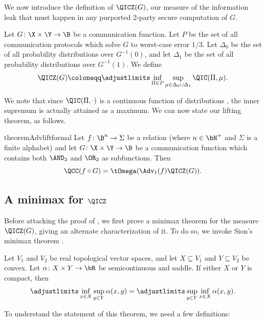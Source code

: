 We now introduce the definition of $\QICZ(G)$,
our measure of the information leak that must
happen in any purported 2-party secure computation of $G$.

\begin{definition}
Let $G\colon\X\times\Y\to\B$ be a communication function.
Let $P$ be the set of all communication protocols
which solve $G$ to worst-case error $1/3$.
Let $\Delta_0$ be the set of all probability
distributions over $G^{-1}(0)$, and let
$\Delta_1$ be the set of all probability distributions
over $G^{-1}(1)$. We define
\[\QICZ(G)\coloneqq\adjustlimits
\inf_{\Pi\in P}\sup_{\mu\in\Delta_0\cup\Delta_1}
\QIC(\Pi,\mu).\]
\end{definition}

We note that since $\QIC(\Pi,\cdot)$ is a continuous
function of distributions \cite{BGK+18}, the inner
supremum is actually attained as a maximum.
We can now state our lifting theorem, as follows.

\begin{restatable}{theorem}{Advliftformal}\label{thm:Adv_lift_formal}
Let $f\colon\B^n\to\Sigma$ be a relation
(where $n\in\bN^{+}$ and $\Sigma$ is a finite alphabet)
and let $G\colon\X\times\Y\to\B$ be a communication
function which contains both $\AND_2$ and $\OR_2$
as subfunctions. Then
\[\QCC(f\circ G)=\tOmega(\Adv_1(f)\QICZ(G)).\]
\end{restatable}


\subsection{A minimax for \texorpdfstring{$\QICZ$}{QICZ}}

Before attacking the proof of ,
we first prove a minimax theorem for the measure
$\QICZ(G)$, giving an alternate characterization of it.
To do so, we invoke Sion's minimax theorem \cite{Sio58}.

\begin{fact}\label{fct:Sion}
Let $V_1$ and $V_2$ be real topological vector spaces,
and let $X\subseteq V_1$ and $Y\subseteq V_2$ be convex.
Let $\alpha\colon X\times Y\to\bR$ be semicontinuous and
saddle. If either $X$ or $Y$ is compact, then
\[\adjustlimits\inf_{x\in X}\sup_{y\in Y}\alpha(x,y)
=\adjustlimits\sup_{y\in Y}\inf_{x\in X}\alpha(x,y).\]
\end{fact}

To understand the statement of this theorem,
we need a few definitions:

